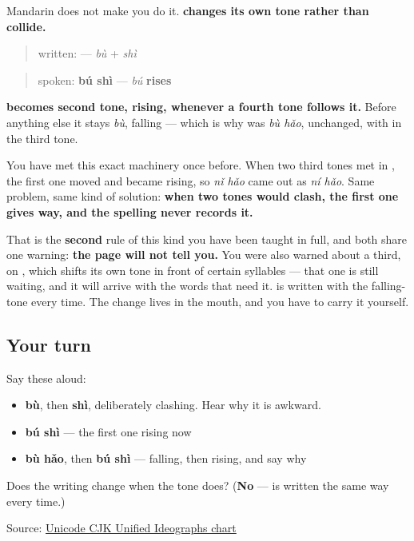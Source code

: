 \begin{culture}
Mandarin does not make you do it. \textbf{ changes its own tone rather than collide.}

\begin{quote}
written: \textbf{} — \emph{bù} + \emph{shì}
\end{quote}

\begin{quote}
spoken: \textbf{bú shì} — \emph{bú} \textbf{rises}
\end{quote}

\textbf{ becomes second tone, rising, whenever a fourth tone follows it.} Before anything else it stays \emph{bù}, falling — which is why  was \emph{bù hǎo}, unchanged, with  in the third tone.

You have met this exact machinery once before. When two third tones met in , the first one moved and became rising, so \emph{nǐ hǎo} came out as \emph{ní hǎo}. Same problem, same kind of solution: \textbf{when two tones would clash, the first one gives way, and the spelling never records it.}

That is the \textbf{second} rule of this kind you have been taught in full, and both share one warning: \textbf{the page will not tell you.} You were also warned about a third, on , which shifts its own tone in front of certain syllables — that one is still waiting, and it will arrive with the words that need it.  is written with the falling-tone  every time. The change lives in the mouth, and you have to carry it yourself.
\end{culture}

\subsection*{Your turn}
Say these aloud:

\begin{itemize}
\raggedright
  \item \textbf{bù}, then \textbf{shì}, deliberately clashing. Hear why it is awkward.
  \item \textbf{bú shì} — the first one rising now
  \item \textbf{bù hǎo}, then \textbf{bú shì} — falling, then rising, and say why
\end{itemize}

\begin{tcolorbox}[breakable,colback=teal!4,colframe=teal!35!black,title={Before you move on}]
Does the writing change when the tone does? (\textbf{No} —  is written the same way every time.)

Source: \href{https://www.unicode.org/charts/PDF/U4E00.pdf}{Unicode CJK Unified Ideographs chart}
\end{tcolorbox}
